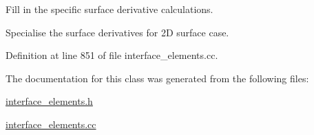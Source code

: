 Fill in the specific surface derivative calculations. 

Specialise the surface derivatives for 2D surface case. 

Definition at line 851 of file interface\+\_\+elements.\+cc.



The documentation for this class was generated from the following files\+:\begin{DoxyCompactItemize}
\item 
\hyperlink{interface__elements_8h}{interface\+\_\+elements.\+h}\item 
\hyperlink{interface__elements_8cc}{interface\+\_\+elements.\+cc}\end{DoxyCompactItemize}
